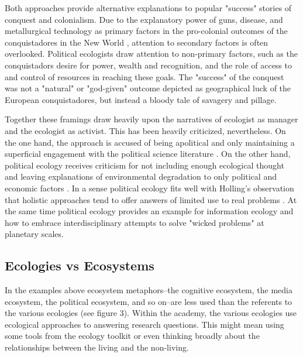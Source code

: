 Both approaches provide alternative explanations to popular "success" stories of conquest and colonialism. Due to the explanatory power of guns, disease, and metallurgical technology as primary factors in the pro-colonial outcomes of the conquistadores in the New World \citep[cf.][]{diamond_1997}, attention to secondary factors is often overlooked. Political ecologists draw attention to non-primary factors, such as the conquistadors desire for power, wealth and recognition, and the role of access to and control of resources in reaching these goals. The "success" of the conquest was not a "natural" or "god-given" outcome depicted as geographical luck of the European conquistadores, but instead a bloody tale of savagery and pillage. 

Together these framings draw heavily upon the narratives of ecologist as manager and the ecologist as activist. This has been heavily criticized, nevertheless. On the one hand, the approach is accused of being apolitical and only maintaining a superficial engagement with the political science literature \citep{walker_2007}. On the other hand, political ecology receives criticism for not including enough ecological thought and leaving explanations of environmental degradation to only political and economic factors \citep{vayda_1999,walker_2005}. In a sense political ecology fits well with Holling's observation that holistic approaches tend to offer answers of limited use to real problems \citep{holling_1998}. At the same time political ecology provides an example for information ecology and how to embrace interdisciplinary attempts to solve "wicked problems" at planetary scales.

\subsection{Ecologies vs Ecosystems}

In the examples above ecosystem metaphors--the cognitive ecosystem, the media ecosystem, the political ecosystem, and so on--are less used than the referents to the various ecologies (see figure 3). Within the academy, the various ecologies use ecological approaches to answering research questions. This might mean using some tools from the ecology toolkit or even thinking broadly about the relationships between the living and the non-living. 

